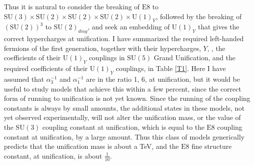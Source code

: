 \documentclass[a4paper,12pt,oneside]{article}
\begin{document}
Thus it is natural to consider the breaking of $\mathrm{E}8$ to
$\mathrm{SU}(3)\times\mathrm{SU}(2)\times\mathrm{SU}(2)\times
\mathrm{SU}(2)\times\mathrm{U}(1)_Y$, 
followed by the breaking of $(\mathrm{SU}(2))^3$ to
$\mathrm{SU}(2)_{diag}$, and seek an embedding of 
$\mathrm{U}(1)_Y$ that gives the correct hypercharges at 
unification.  I have summarized the required left-handed fermions of
the first generation, together with their hypercharges, $Y$, 
\cite{Rosner}, the coefficients of their $\mathrm{U}(1)_Y$ couplings
in $\mathrm{SU}(5)$ Grand Unification, and the required coefficients
of their $\mathrm{U}(1)_Y$ couplings, in Table \ref{T1}.  Here I 
have assumed that $\alpha_3^{-1}$ and $\alpha_1^{-1}$ are in the
ratio 1, 6, at unification, but it would be useful to study models 
that achieve this within a few percent, since the correct form of 
running to unification is not yet known.  Since the running of the
coupling constants is always by small amounts, the additional states
in these models, not yet observed experimentally, will not alter the
unification mass, or the value of the $\mathrm{SU}(3)$ coupling
constant at unification, which is equal to the $\mathrm{E}8$ 
coupling constant at unification, by a large amount.  Thus this 
class of models generically predicts that the unification mass is
about a TeV, and the $\mathrm{E}8$ fine structure constant, at 
unification, is about $\frac{1}{10}$.
\end{document}
